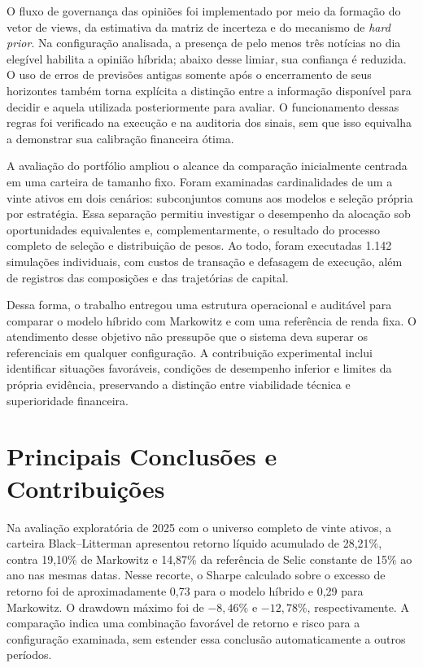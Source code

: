 O fluxo de governança das opiniões foi implementado por meio da formação do vetor de views, da estimativa da matriz de incerteza e do mecanismo de \emph{hard prior}. Na configuração analisada, a presença de pelo menos três notícias no dia elegível habilita a opinião híbrida; abaixo desse limiar, sua confiança é reduzida. O uso de erros de previsões antigas somente após o encerramento de seus horizontes também torna explícita a distinção entre a informação disponível para decidir e aquela utilizada posteriormente para avaliar. O funcionamento dessas regras foi verificado na execução e na auditoria dos sinais, sem que isso equivalha a demonstrar sua calibração financeira ótima.

A avaliação do portfólio ampliou o alcance da comparação inicialmente centrada em uma carteira de tamanho fixo. Foram examinadas cardinalidades de um a vinte ativos em dois cenários: subconjuntos comuns aos modelos e seleção própria por estratégia. Essa separação permitiu investigar o desempenho da alocação sob oportunidades equivalentes e, complementarmente, o resultado do processo completo de seleção e distribuição de pesos. Ao todo, foram executadas 1.142 simulações individuais, com custos de transação e defasagem de execução, além de registros das composições e das trajetórias de capital.

Dessa forma, o trabalho entregou uma estrutura operacional e auditável para comparar o modelo híbrido com Markowitz e com uma referência de renda fixa. O atendimento desse objetivo não pressupõe que o sistema deva superar os referenciais em qualquer configuração. A contribuição experimental inclui identificar situações favoráveis, condições de desempenho inferior e limites da própria evidência, preservando a distinção entre viabilidade técnica e superioridade financeira.

\section{Principais Conclusões e Contribuições}
\label{sec:conclusao_contribuicoes}

Na avaliação exploratória de 2025 com o universo completo de vinte ativos, a carteira Black--Litterman apresentou retorno líquido acumulado de 28,21\%, contra 19,10\% de Markowitz e 14,87\% da referência de Selic constante de 15\% ao ano nas mesmas datas. Nesse recorte, o Sharpe calculado sobre o excesso de retorno foi de aproximadamente 0,73 para o modelo híbrido e 0,29 para Markowitz. O drawdown máximo foi de $-8{,}46\%$ e $-12{,}78\%$, respectivamente. A comparação indica uma combinação favorável de retorno e risco para a configuração examinada, sem estender essa conclusão automaticamente a outros períodos.

